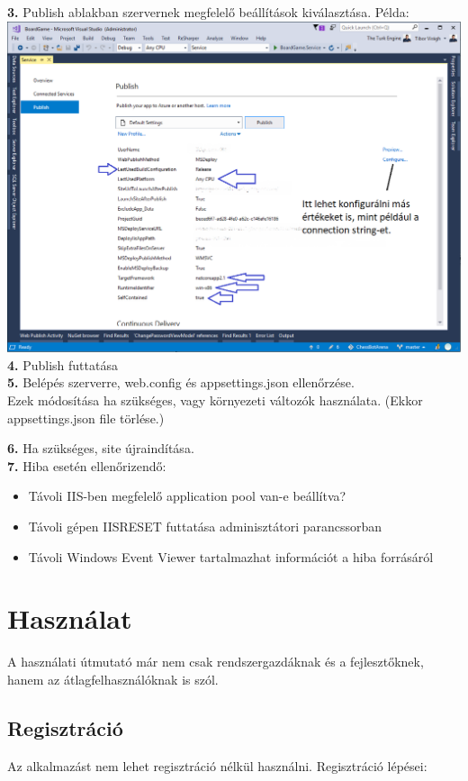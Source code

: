 \documentclass[twoside, a4paper, 12pt]{book}
\begin{document}
\noindent \textbf{3.} Publish ablakban szervernek megfelelő beállítások kiválasztása. Példa: \\
\includegraphics[width=1.0\textwidth]{img/server_prod_run_6.png} \\

\noindent \textbf{4.} Publish futtatása \\

\noindent \textbf{5.} Belépés szerverre, web.config és appsettings.json ellenőrzése. \\
Ezek módosítása ha szükséges, vagy környezeti változók használata. (Ekkor appsettings.json file törlése.)

\noindent \textbf{6.} Ha szükséges, site újraindítása. \\

\noindent \textbf{7.} Hiba esetén ellenőrizendő:
\begin{itemize}
	\item Távoli IIS-ben megfelelő application pool van-e beállítva?
	\item Távoli gépen IISRESET futtatása adminisztátori parancssorban
	\item Távoli Windows Event Viewer tartalmazhat információt a hiba forrásáról
\end{itemize}

\section{Használat}
A használati útmutató már nem csak rendszergazdáknak és a fejlesztőknek, hanem az átlagfelhasználóknak is szól.
\subsection{Regisztráció}
Az alkalmazást nem lehet regisztráció nélkül használni. Regisztráció lépései:\\
\end{document}
